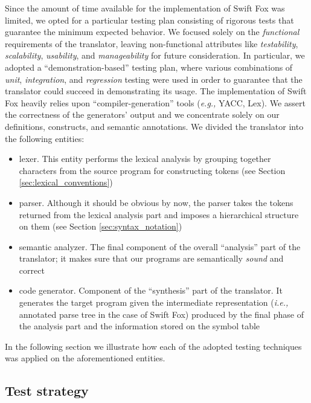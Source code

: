 Since the amount of time available for the implementation of Swift Fox was
limited, we opted for a particular testing plan consisting of rigorous
tests that guarantee the minimum expected behavior. We focused solely on
the \textit{functional} requirements of the translator, leaving
non-functional attributes like \textit{testability}, \textit{scalability}, 
\textit{usability}, and \textit{manageability} for future consideration.
In particular, we adopted a ``demonstration-based'' testing plan, where
various combinations of \textit{unit}, \textit{integration}, and
\textit{regression} testing were used in order to guarantee that the
translator could succeed in demonstrating its usage. The implementation of 
Swift Fox heavily relies upon ``compiler-generation'' tools (\textit{e.g.,}
YACC, Lex). We assert the correctness of the generators' output and we
concentrate solely on our definitions, constructs, and semantic
annotations. We divided the translator into the following entities:
\begin{itemize}
	\item lexer. This entity performs the lexical analysis by grouping
	together characters from the source program for constructing tokens
	(see Section \ref{sec:lexical_conventions})
	\item parser. Although it should be obvious by now, the parser
	takes the tokens returned from the lexical analysis part and
	imposes a hierarchical structure on them (see Section
	\ref{sec:syntax_notation})
	\item semantic analyzer. The final component of the overall
	``analysis'' part of the translator; it makes sure that our
	programs are semantically \textit{sound} and correct
	\item code generator. Component of the ``synthesis'' part of the
	translator. It generates the target program given the intermediate
	representation (\textit{i.e.,} annotated parse tree in the
	case of Swift Fox) produced by the final phase of the analysis part
	and the information stored on the symbol table
\end{itemize}

In the following section we illustrate how each of the adopted testing
techniques was applied on the aforementioned entities.

\subsection{Test strategy}

